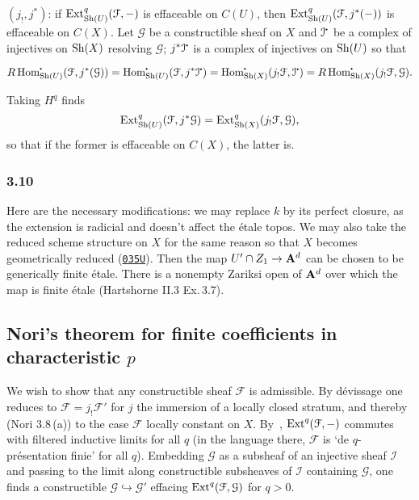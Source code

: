 \documentclass[deligne.tex]{subfiles}
\begin{document}
$(j_!,j^*)$: if $\operatorname{Ext}^q_{\operatorname{Sh}(U)}(\mathcal F,-)$ is effaceable on $C(U)$, 
then $\operatorname{Ext}^q_{\operatorname{Sh}(U)}(\mathcal F,j^*(-))$ is effaceable on $C(X)$.
Let $\mathcal G$ be a constructible sheaf on $X$ and $\mathcal I^\dotp$ be a 
complex of injectives on $\operatorname{Sh}(X)$ resolving $\mathcal G$;
$j^*\mathcal I^\dotp$ is a complex of injectives on $\operatorname{Sh}(U)$ so that
\begin{ceqn}\begin{equation*}
	R\Hom^\dotp_{\Sh(U)}(\mathcal F,j^*(\mathcal G))
	=\Hom^\dotp_{\Sh(U)}(\mathcal F,j^*\mathcal I^\dotp)
	=\Hom^\dotp_{\Sh(X)}(j_!\mathcal F,\mathcal I^\dotp)
	=R\Hom^\dotp_{\Sh(X)}(j_!\mathcal F,\mathcal G).
\end{equation*}\end{ceqn}
Taking $H^q$ finds
\begin{equation*}
	\operatorname{Ext}^q_{\operatorname{Sh}(U)}(\mathcal F,j^*\mathcal G)
	=\operatorname{Ext}^q_{\operatorname{Sh}(X)}(j_!\mathcal F,\mathcal G),
\end{equation*}
so that if the former is effaceable on $C(X)$, the latter is.



\subsubsection*{3.10} Here are the necessary modifications: we may replace
$k$ by its perfect closure, as the extension is radicial and doesn't affect
the étale topos. We may also take the reduced scheme structure on $X$ for 
the same reason so that $X$ becomes geometrically reduced
(\hyperref[https://stacks.math.columbia.edu/tag/035U]{\texttt{035U}}).
Then the map $U'\cap Z_1\rightarrow\mathbf{A}^d$ can be chosen to be generically finite 
étale. There is a nonempty Zariksi open of $\mathbf{A}^d$ over which the map is 
finite étale (Hartshorne II.3 Ex.\,3.7).


\subsection*{Nori's theorem for finite coefficients in characteristic $p$}
We wish to show that any constructible sheaf $\mathcal F$ is admissible.
By dévissage one reduces to $\mathcal F=j_!\mathcal F'$ for $j$ the
immersion of a locally closed stratum, and thereby (Nori 3.8\,(a)) to the
case $\mathcal F$ locally constant on $X$.
By~\cite[VI 5.8]{SGAA}, $\operatorname{Ext}^q(\mathcal F,-)$ commutes with filtered 
inductive limits for all $q$ (in the language there, $\mathcal F$ is
`de $q$-présentation finie' for all $q$).
Embedding $\mathcal G$ as a subsheaf of an injective sheaf $\mathcal I$ 
and passing to the limit along constructible subsheaves of $\mathcal I$
containing $\mathcal G$, one finds a constructible
$\mathcal G\hookrightarrow\mathcal G'$ effacing 
$\operatorname{Ext}^q(\mathcal F,\mathcal G)$ for $q>0$.
\end{document}
